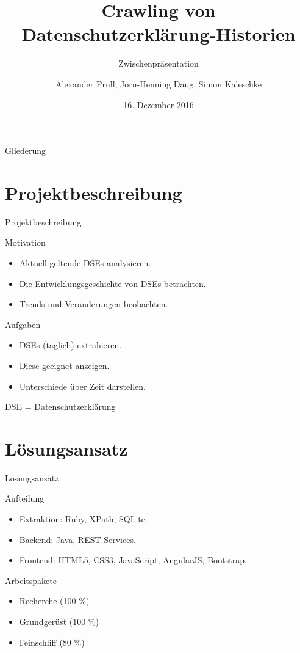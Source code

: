 \documentclass[halfparskip]{beamer}
\title{Crawling von Datenschutzerklärung-Historien}
\subtitle{Zwischenpräsentation}
\author[AP, JHD, SK]{Alexander Prull, Jörn-Henning Daug, Simon Kaleschke}
\institute{Universität Leipzig}
\date[16. 12. 2016]{16. Dezember 2016}
\begin{document}
\begin{frame}
  \titlepage
\end{frame}

\begin{frame}{Gliederung}
  \tableofcontents
\end{frame}

\section{Projektbeschreibung}
\begin{frame}{Projektbeschreibung}
	\begin{block}{Motivation}
	\begin{itemize}[label=$\bullet$]
	\item Aktuell geltende DSEs analysieren.
	\item Die Entwicklungsgeschichte von DSEs betrachten.
	\item Trends und Veränderungen beobachten.
	\end{itemize}
	\end{block}
	\begin{block}{Aufgaben}
		\begin{itemize}[label=$\bullet$]
			\item DSEs (täglich) extrahieren.
			\item Diese geeignet anzeigen.
			\item Unterschiede über Zeit darstellen.
		\end{itemize}
	\end{block}
	{\tiny DSE = Datenschutzerklärung}
\end{frame}

\section{Lösungsansatz}
\begin{frame}{Lösungsansatz}
	\begin{block}{Aufteilung}
		\begin{itemize}[label=$\bullet$]
			\item Extraktion: Ruby, XPath, SQLite.
			\item Backend: Java, REST-Services.
			\item Frontend: HTML5, CSS3, JavaScript, AngularJS, Bootstrap.
		\end{itemize}
	\end{block}
	\begin{block}{Arbeitspakete}
		\begin{itemize}[label=$\bullet$]
			\item Recherche (100 \%)
			\item Grundgerüst (100 \%)
			\item Feinschliff (80 \%)
		\end{itemize}
	\end{block}
\end{frame}
\end{document}

